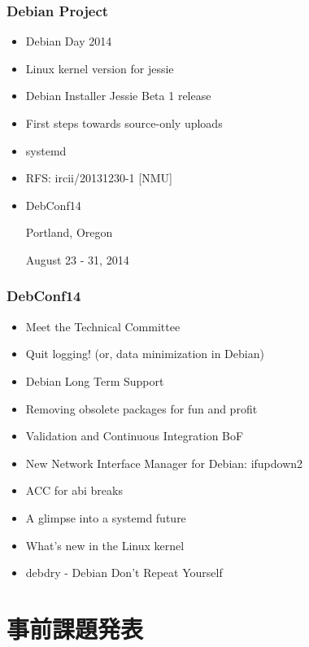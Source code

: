 \documentclass[cjk,dvipdfmx,10pt,compress,%
hyperref={bookmarks=true,bookmarksnumbered=true,bookmarksopen=false,%
colorlinks=false,%
pdftitle={第 87 回 関西 Debian 勉強会},%
pdfauthor={倉敷・のがた・佐々木・かわだ・八津尾},%
pdfsubject={資料},%
}]{beamer}
\begin{document}
\begin{frame}[fragile]
  \frametitle{Debian Project}
  \begin{itemize}
  \item Debian Day 2014
  \item Linux kernel version for jessie
  \item Debian Installer Jessie Beta 1 release
  \item First steps towards source-only uploads
  \item systemd
  \item RFS: ircii/20131230-1 [NMU]
  \item DebConf14

    Portland, Oregon

    August 23 - 31, 2014
  \end{itemize}
\end{frame}

\begin{frame}[fragile]
  \frametitle{DebConf14}
  \begin{block}{}
    \begin{itemize}
    \item Meet the Technical Committee
    \item Quit logging! (or, data minimization in Debian)
    \item Debian Long Term Support
    \item Removing obsolete packages for fun and profit
    \item Validation and Continuous Integration BoF
    \item New Network Interface Manager for Debian: ifupdown2
    \item ACC for abi breaks
    \item A glimpse into a systemd future
    \item What's new in the Linux kernel
    \item debdry - Debian Don't Repeat Yourself
    \end{itemize}
  \end{block}
\end{frame}


\section{事前課題発表}

\end{document}
